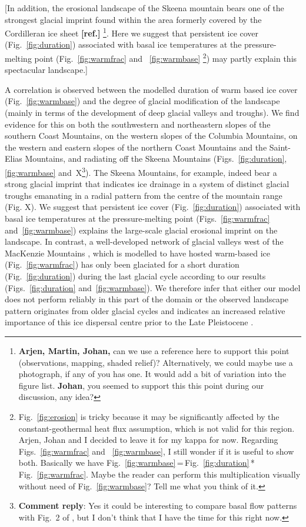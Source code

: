 \documentclass[tc, manuscript]{copernicus}
\newcommand{\renote}[1]{\footnote{\textbf{Comment reply}: #1}}
\newcommand{\aref}[0]{\textbf{[ref.]}}
\begin{document}
[In addition, the erosional landscape of the Skeena mountain bears one of the
strongest glacial imprint found within the area formerly covered by the
Cordilleran ice sheet \aref%
\footnote{\textbf{Arjen, Martin, Johan,} can we use a reference here to support
    this point (observations, mapping, shaded relief)? Alternatively, we could
    maybe use a photograph, if any of you has one. It would add a bit of
    variation into the figure list. \textbf{Johan}, you seemed to support this
    this point during our discussion, any idea?}.
Here we suggest that persistent ice cover (Fig.~\ref{fig:duration})
associated with basal ice temperatures at the pressure-melting point
(Fig.~\ref{fig:warmfrac} and ~\ref{fig:warmbase}%
\footnote{Fig.~\ref{fig:erosion} is tricky because it may be significantly
    affected by the constant-geothermal heat flux assumption, which is not
    valid for this region. Arjen, Johan and I decided to leave it for my kappa
    for now. Regarding Figs.~\ref{fig:warmfrac} and ~\ref{fig:warmbase}, I
    still wonder if it is useful to show both. Basically we have
    Fig.~\ref{fig:warmbase}\,=\,Fig.~\ref{fig:duration}\,*\,Fig.~\ref{fig:warmfrac}.
    Maybe the reader can perform this multiplication visually without need of
    Fig.~\ref{fig:warmbase}? Tell me what you think of it.})
may partly explain this spectacular landscape.]

A correlation is observed between the modelled duration of warm based ice cover
(Fig.~\ref{fig:warmbase}) and the degree of glacial modification of the
landscape (mainly in terms of the development of deep glacial valleys and
troughs). We find evidence for this on both the southwestern and northeastern
slopes of the southern Coast Mountains, on the western slopes of the Columbia
Mountains, on the western and eastern slopes of the northern Coast Mountains
and the Saint-Elias Mountains, and radiating off the Skeena Mountains
(Figs.~\ref{fig:duration}, \ref{fig:warmbase} and~X\renote{
    Yes it could be interesting to compare basal flow patterns with Fig.~2 of
    \citet{Kleman.etal.2010}, but I don't think that I have the time for this
    right now.}).
The Skeena Mountains, for example, indeed bear a strong glacial imprint that
indicates ice drainage in a system of distinct glacial troughs emanating in a
radial pattern from the centre of the mountain range (Fig. X). We suggest that
persistent ice cover (Fig.~\ref{fig:duration}) associated with basal ice
temperatures at the pressure-melting point (Figs.~\ref{fig:warmfrac}
and~\ref{fig:warmbase}) explains the large-scale glacial erosional imprint on
the landscape. In contrast, a well-developed network of glacial valleys west of
the MacKenzie Mountains \citep[Fig.~X;][]{Kleman.etal.2010,
Stroeven.etal.2010}, which is modelled to have hosted warm-based ice
(Fig.~\ref{fig:warmfrac}) has only been glaciated for a short duration
(Fig.~\ref{fig:duration}) during the last glacial cycle according to our
results (Figs.~\ref{fig:duration} and~\ref{fig:warmbase}). We therefore infer
that either our model does not perform reliably in this part of the domain or
the observed landscape pattern originates from older glacial cycles and
indicates an increased relative importance of this ice dispersal centre prior
to the Late Pleistocene \citep[cf.][]{Ward.etal.2008, Demuro.etal.2012}.
\end{document}
